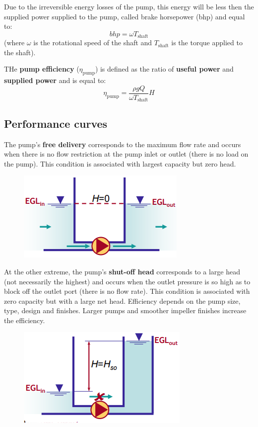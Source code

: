 \documentclass[class=report, crop=false, 12pt,a4paper]{standalone}
\begin{document}
Due to the irreversible energy losses of the pump, this energy will be less then the supplied power supplied to the pump, called brake horsepower (bhp) and equal to:
\begin{equation}
  bhp = \omega T_{\textrm{shaft}}
\end{equation}
(where $\omega$ is the rotational speed of the shaft and $T_{\textrm{shaft}}$ is the torque applied to the shaft).

THe \textbf{pump efficiency} ($\eta_{\textrm{pump}}$) is defined as the ratio of \textbf{useful power} and \textbf{supplied power} and is equal to:
\begin{equation}
  \eta_{\textrm{pump}} = \frac{\rho g Q}{\omega T_{\textrm{shaft}}} H
\end{equation}
\subsection{Performance curves}
The pump's \textbf{free delivery} corresponds to the maximum flow rate and occurs when there is no flow restriction at the pump inlet or outlet (there is no load on the pump). This condition is associated with largest capacity but zero head.
\begin{figure}[H]
  \centering
  \includegraphics[width = 0.8 \textwidth]{../img/freedelivery.png}
\end{figure}
At the other extreme, the pump's \textbf{shut-off head} corresponds to a large head (not necessarily the highest) and occurs when the outlet pressure is so high as to block off the outlet port (there is no flow rate). This condition is associated with zero capacity but with a large net head. Efficiency depends on the pump size, type, design and finishes. Larger pumps and smoother impeller finishes increase the efficiency.
\begin{figure}[H]
  \centering
  \includegraphics[width = 0.8 \textwidth]{../img/shutoffhead.png}
\end{figure}
\end{document}
